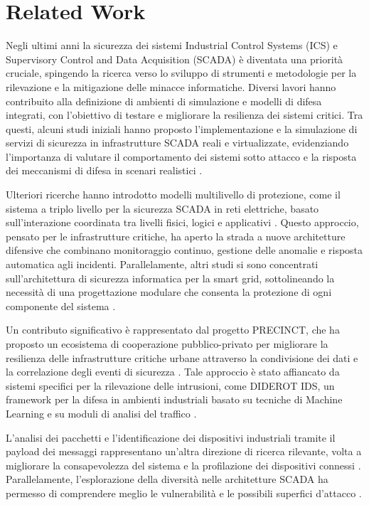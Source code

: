\chapter{Related Work}
\label{sec:lavori_correlati}

Negli ultimi anni la sicurezza dei sistemi Industrial Control Systems (ICS) e Supervisory Control and Data Acquisition (SCADA) è diventata una priorità cruciale, spingendo la ricerca verso lo sviluppo di strumenti e metodologie per la rilevazione e la mitigazione delle minacce informatiche. Diversi lavori hanno contribuito alla definizione di ambienti di simulazione e modelli di difesa integrati, con l’obiettivo di testare e migliorare la resilienza dei sistemi critici. Tra questi, alcuni studi iniziali hanno proposto l’implementazione e la simulazione di servizi di sicurezza in infrastrutture SCADA reali e virtualizzate, evidenziando l’importanza di valutare il comportamento dei sistemi sotto attacco e la risposta dei meccanismi di difesa in scenari realistici \cite{simulationImplementationSecurityServices}.

Ulteriori ricerche hanno introdotto modelli multilivello di protezione, come il sistema a triplo livello per la sicurezza SCADA in reti elettriche, basato sull’interazione coordinata tra livelli fisici, logici e applicativi \cite{tripleLayerScadaSecurityOfElectricUtility}. Questo approccio, pensato per le infrastrutture critiche, ha aperto la strada a nuove architetture difensive che combinano monitoraggio continuo, gestione delle anomalie e risposta automatica agli incidenti. Parallelamente, altri studi si sono concentrati sull’architettura di sicurezza informatica per la smart grid, sottolineando la necessità di una progettazione modulare che consenta la protezione di ogni componente del sistema \cite{architectingCyberSecSmartGrid}.

Un contributo significativo è rappresentato dal progetto PRECINCT, che ha proposto un ecosistema di cooperazione pubblico-privato per migliorare la resilienza delle infrastrutture critiche urbane attraverso la condivisione dei dati e la correlazione degli eventi di sicurezza \cite{precinct}. Tale approccio è stato affiancato da sistemi specifici per la rilevazione delle intrusioni, come DIDEROT IDS, un framework per la difesa in ambienti industriali basato su tecniche di Machine Learning e su moduli di analisi del traffico \cite{diderotIds}.

L’analisi dei pacchetti e l’identificazione dei dispositivi industriali tramite il payload dei messaggi rappresentano un’altra direzione di ricerca rilevante, volta a migliorare la consapevolezza del sistema e la profilazione dei dispositivi connessi \cite{identificationPayloadIndustrialDevices}. Parallelamente, l’esplorazione della diversità nelle architetture SCADA ha permesso di comprendere meglio le vulnerabilità e le possibili superfici d’attacco \cite{scadaDiversityExploration}.

